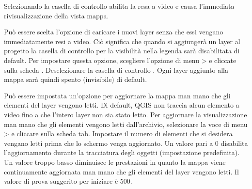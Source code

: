 Selezionando la casella di controllo  abilita la resa a
video e causa l'immediata rivisualizzazione della vista mappa.

\label{label_settinglayer}

Può essere scelta l'opzione di caricare i nuovi layer senza che essi vengano
immediatamente resi a video. Ciò significa che quando si aggiungerà un layer
al progetto la casella di controllo per la visibilità nella legenda sarà
disabilitata di default. Per impostare questa opzione, scegliere l'opzione di
menu  >  e cliccate sulla
scheda . Deselezionare la casella di controllo . Ogni layer aggiunto alla mappa sarà quindi spento
(invisibile) di default.

%
%

\label{label_updatemap}

Può essere impostata un'opzione per aggiornare la mappa man mano che gli
elementi del layer vengono letti. Di default, QGIS non traccia alcun elemento a video
fino a che l'intero layer non sia stato letto. Per aggiornare la visualizzazione
man mano che gli elementi vengono letti dall'archivio, selezionare la
voce di menu  >  e cliccare sulla
scheda  tab. Impostare il numero di elementi che si desidera
vengano letti prima che lo schermo venga aggiornato. Un valore pari a 0
disabilita l'aggiornamento durante la tracciatura degli oggetti (impostazione
predefinita). Un valore troppo basso diminuisce le prestazioni in quanto la
mappa viene continuamente aggiornata man mano che gli elementi del layer
vengono letti. Il valore di prova suggerito per iniziare è 500. 

